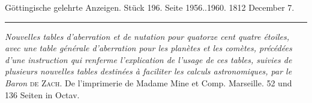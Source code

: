 \clearpage
{}
\hypertarget{native-551-lower}{}\label{native-551-lower}
\begin{center}\small Göttingische gelehrte Anzeigen. Stück 196. Seite 1956..1960. 1812 December 7.\\[3pt]\rule{.72\linewidth}{.3pt}\end{center}

\emph{Nouvelles tables d'aberration et de nutation pour quatorze cent quatre étoiles, avec une table générale d'aberration pour les planètes et les comètes, précédées d'une instruction qui renferme l'explication de l'usage de ces tables, suivies de plusieurs nouvelles tables destinées à faciliter les calculs astronomiques, par le Baron} \textsc{de Zach}. De l'imprimerie de Madame Mine et Comp. Marseille. 52 und 136 Seiten in Octav.

